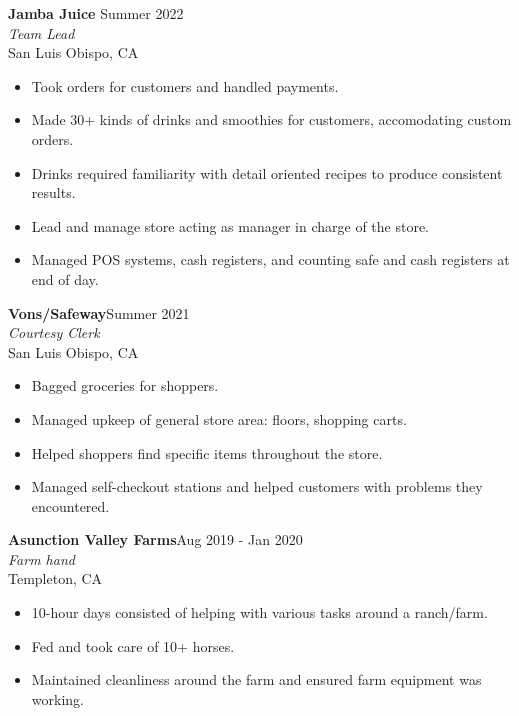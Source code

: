 \documentclass[11pt]{article}
\begin{document}
    \begin{adjustwidth}{1em}{1em}


    \textbf{Jamba Juice} \hfill Summer 2022
    \\\textit{Team Lead}
    \\San Luis Obispo, CA
    \begin{itemize}
        \item Took orders for customers and handled payments.
        \item Made 30+ kinds of drinks and smoothies for customers, accomodating custom orders.
        \item Drinks required familiarity with detail oriented recipes to produce consistent results.
        \item Lead and manage store acting as manager in charge of the store.
        \item Managed POS systems, cash registers, and counting safe and cash registers at end of day.
    \end{itemize}

    \vspace{7mm}

    \textbf{Vons/Safeway}\hfill Summer 2021
    \\ \textit{Courtesy Clerk} 
    \\San Luis Obispo, CA
    \begin{itemize}
        \item Bagged groceries for shoppers.
        \item Managed upkeep of general store area: floors, shopping carts.
        \item Helped shoppers find specific items throughout the store.
        \item Managed self-checkout stations and helped customers with problems they encountered.
    \end{itemize}


    \textbf{Asunction Valley Farms}\hfill Aug 2019 - Jan 2020
    \\ \textit{Farm hand} 
    \\Templeton, CA
    \begin{itemize}
        \item 10-hour days consisted of helping with various tasks around a ranch/farm.
        \item Fed and took care of 10+ horses.
        \item Maintained cleanliness around the farm and ensured farm equipment was working.
    \end{itemize}
        
    \end{adjustwidth}
\end{document}
